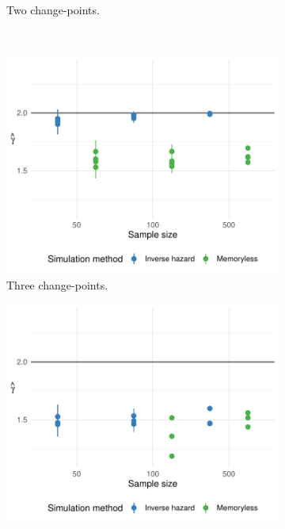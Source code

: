 \begin{figure}[ht]
\begin{subfigure}[b]{0.45\textwidth}
         \caption{Two change-points.}
         \label{fig:weib2gplot}
     \end{subfigure}
     \\
     \begin{subfigure}[b]{0.45\textwidth}
         \centering
         \includegraphics[width=\textwidth]{weib3_gplot.pdf}
         \caption{Three change-points.}
         \label{fig:weib3gplot}
     \end{subfigure}
     \hfill
     \begin{subfigure}[b]{0.45\textwidth}
         \centering
         \includegraphics[width=\textwidth]{weib4_gplot.pdf}

\end{subfigure}
\end{figure}
